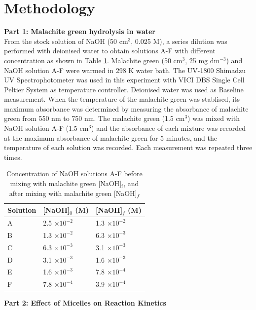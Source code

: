 \documentclass[twocolumn]{article} %
\begin{document}
\section{Methodology}
\textbf{Part 1: Malachite green hydrolysis in water}\\
From the stock solution of NaOH (50 cm$^{3}$, 0.025 M), a series dilution was performed with deionised water to obtain solutions A-F with different concentration as shown in Table \ref{NaOH}. Malachite green (50 cm$^{3}$, 25 mg dm$^{-3}$) and NaOH solution A-F were warmed in 298 K water bath. The UV-1800 Shimadzu UV Spectrophotometer was used in this experiment with VICI DBS Single Cell Peltier System as temperature controller. Deionised water was used as Baseline measurement. When the temperature of the malachite green was stablised, its maximum absorbance was determined by measuring the absorbance of malachite green from 550 nm to 750 nm. The malachite green (1.5 cm$^3$) was mixed with NaOH solution A-F (1.5 cm$^3$) and the absorbance of each mixture was recorded at the maximum absorbance of malachite green for 5 minutes, and the temperature of each solution was recorded. Each measurement was repeated three times.\\

\begin{table}[h]
    \caption{Concentration of NaOH solutions A-F before mixing with malachite green [NaOH]$_i$, and after mixing with malachite green [NaOH]$_f$}
    \label{NaOH}
    \begin{tabular}{L{0.6in}C{1.2in}C{1.2in}}\toprule
        Solution &  [NaOH]$_0$ (M)   & [NaOH]$_f$ (M)\\\midrule
        A &   2.5 $\times 10^{-2}$    &   1.3 $\times 10^{-2}$ \\
        B & 1.3 $\times 10^{-2}$ &    6.3 $\times 10^{-3}$ \\
        C & 6.3 $\times 10^{-3}$& 3.1 $\times 10^{-3}$     \\
        D & 3.1 $\times 10^{-3}$ & 1.6 $\times 10^{-3}$      \\
        E & 1.6 $\times 10^{-3}$& 7.8 $\times 10^{-4}$   \\
        F & 7.8 $\times 10^{-4}$ & 3.9 $\times 10^{-4}$    \\\bottomrule
   \end{tabular}
\end{table}


\textbf{Part 2: Effect of Micelles on Reaction Kinetics}\\
\end{document}
